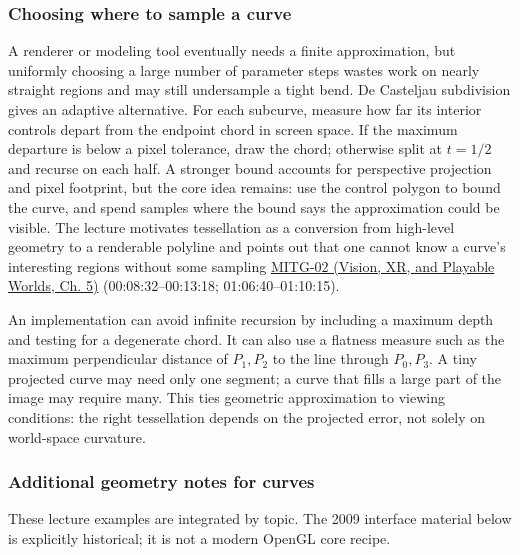 \subsubsection{Choosing where to sample a curve}\label{03-visual-computing-i-ch001-choosing-where-to-sample-a-curve}

\hypertarget{03-visual-computing-i-ch001-choosing-where-to-sample-a-curve}{}

A renderer or modeling tool eventually needs a finite approximation, but uniformly choosing a large number of parameter steps wastes work on nearly straight regions and may still undersample a tight bend. De Casteljau subdivision gives an adaptive alternative. For each subcurve, measure how far its interior controls depart from the endpoint chord in screen space. If the maximum departure is below a pixel tolerance, draw the chord; otherwise split at \(t=1/2\) and recurse on each half. A stronger bound accounts for perspective projection and pixel footprint, but the core idea remains: use the control polygon to bound the curve, and spend samples where the bound says the approximation could be visible. The lecture motivates tessellation as a conversion from high-level geometry to a renderable polyline and points out that one cannot know a curve's interesting regions without some sampling \href{../07-Vision-XR-and-Playable-Worlds/main.pdf\#nameddest=04-visual-computing-ii-ch036-mitg-02---cubic-curves}{MITG-02 (Vision, XR, and Playable Worlds, Ch. 5)} (00:08:32--00:13:18; 01:06:40--01:10:15).

An implementation can avoid infinite recursion by including a maximum depth and testing for a degenerate chord. It can also use a flatness measure such as the maximum perpendicular distance of \(P_1,P_2\) to the line through \(P_0,P_3\). A tiny projected curve may need only one segment; a curve that fills a large part of the image may require many. This ties geometric approximation to viewing conditions: the right tessellation depends on the projected error, not solely on world-space curvature.

\subsubsection{Additional geometry notes for curves}\label{03-visual-computing-i-ch001-additional-geometry-notes-for-curves}

\hypertarget{03-visual-computing-i-ch001-additional-geometry-notes-for-curves}{}

These lecture examples are integrated by topic. The 2009 interface material below is explicitly historical; it is not a modern OpenGL core recipe.

